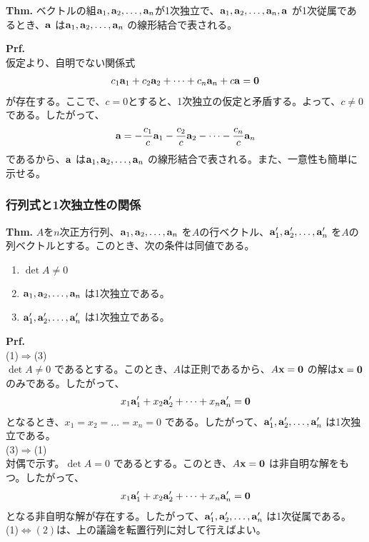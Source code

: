 \documentclass[a4paper,11pt]{jsarticle}
\numberwithin{equation}{section}
\begin{document}
\begin{itembox}[l]{\textbf{Thm.}}
  ベクトルの組$\vb{a}_1, \vb{a}_2, \dots, \vb{a}_n$が1次独立で、$\vb{a}_1, \vb{a}_2, \dots, \vb{a}_n, \vb{a}$ が1次従属であるとき、$\vb{a}$ は$\vb{a}_1, \vb{a}_2, \dots, \vb{a}_n$ の線形結合で表される。
\end{itembox}
\textbf{Prf.}\\
仮定より、自明でない関係式
\begin{align}
  c_1\vb{a}_1 + c_2\vb{a}_2 + \dots + c_n\vb{a}_n + c\vb{a} = \vb{0}
\end{align}
が存在する。ここで、$c =0$とすると、1次独立の仮定と矛盾する。よって、$c \neq 0$である。したがって、
\begin{align}
  \vb{a} = -\frac{c_1}{c}\vb{a}_1 - \frac{c_2}{c}\vb{a}_2 - \dots - \frac{c_n}{c}\vb{a}_n
\end{align}
であるから、$\vb{a}$ は$\vb{a}_1, \vb{a}_2, \dots, \vb{a}_n$ の線形結合で表される。また、一意性も簡単に示せる。\hfill\qedsymbol\\

\subsubsection{行列式と1次独立性の関係}
\begin{itembox}[l]{\textbf{Thm.}}
  $A$を$n$次正方行列、$\vb{a}_1, \vb{a}_2, \dots, \vb{a}_n$ を$A$の行ベクトル、$\vb{a}_1', \vb{a}_2', \dots, \vb{a}_n'$ を$A$の列ベクトルとする。このとき、次の条件は同値である。
  \begin{enumerate}
    \item $\det A \neq 0$
    \item $\vb{a}_1, \vb{a}_2, \dots, \vb{a}_n$ は1次独立である。
    \item $\vb{a}_1', \vb{a}_2', \dots, \vb{a}_n'$ は1次独立である。
  \end{enumerate} 
\end{itembox}
\textbf{Prf.}\\
(1)$\Rightarrow$(3)\\
$\det A \neq 0$ であるとする。このとき、$A$は正則であるから、$A\vb{x} = \vb{0}$ の解は$\vb{x} = \vb{0}$ のみである。したがって、
\begin{align}
  x_1\vb{a}_1' + x_2\vb{a}_2' + \dots + x_n\vb{a}_n' = \vb{0}
\end{align}
となるとき、$x_1 = x_2 = \dots = x_n = 0$ である。したがって、$\vb{a}_1', \vb{a}_2', \dots, \vb{a}_n'$ は1次独立である。\\
(3)$\Rightarrow$(1)\\
対偶で示す。$\det A = 0$ であるとする。このとき、$A\vb{x} = \vb{0}$ は非自明な解をもつ。したがって、
\begin{align}
  x_1\vb{a}_1' + x_2\vb{a}_2' + \dots + x_n\vb{a}_n' = \vb{0}
\end{align}
となる非自明な解が存在する。したがって、$\vb{a}_1', \vb{a}_2', \dots, \vb{a}_n'$ は1次従属である。\\
(1)$\Leftrightarrow(2)$は、上の議論を転置行列に対して行えばよい。\hfill\qedsymbol\\
\end{document}
